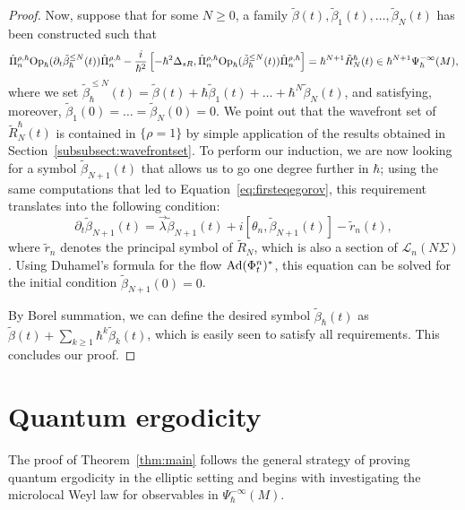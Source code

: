 \documentclass[12pt,a4paper]{amsart}
\theoremstyle{plain}
\theoremstyle{definition}
\theoremstyle{remark}
\numberwithin{equation}{section}
\theoremstyle{definition}
\def \Op{{\rm Op}}
\numberwithin{equation}{section}
\begin{document}
\begin{proof}
    Now, suppose that for some $N\geq 0$, a family $\tilde{\beta}(t),\tilde{\beta}_1(t),\dots,\tilde{\beta}_N(t)$ has been constructed such that 
    \begin{equation*}
        \hat{\Pi}_n^{\rho,\hbar} \Op_\hbar(\partial_t\tilde{\beta}_\hbar^{\leq N}(t))\hat{\Pi}_n^{\rho,\hbar} - \frac{i}{\hbar^2}\left[-\hbar^2\Delta_{sR},\hat{\Pi}_n^{\rho,\hbar} \Op_\hbar(\tilde{\beta}_\hbar^{\leq N}(t))\hat{\Pi}_n^{\rho,\hbar}\right] = \hbar^{N+1} \tilde{R}_N^\hbar(t)\in \hbar^{N+1}\Psi_\hbar^{-\infty}(M),
    \end{equation*}
    where we set $\tilde{\beta}_\hbar^{\leq N}(t) = \tilde{\beta}(t) + \hbar \tilde{\beta}_1(t)+\dots+\hbar^N\tilde{\beta}_N(t)$, and satisfying, moreover, $\tilde{\beta}_1(0) = \dots = \tilde{\beta}_N(0) = 0$. We point out that the wavefront set of $\tilde{R}_N^\hbar(t)$ is contained in $\{\rho = 1\}$ by simple application of the results obtained in Section~\ref{subsubsect:wavefrontset}. To perform our induction, we are now looking for a symbol $\tilde{\beta}_{N+1}(t)$ that allows us to go one degree further in $\hbar$; using the same computations that led to Equation~\eqref{eq:firsteqegorov}, this requirement translates into the following condition:
    \begin{equation*}
        \partial_t \tilde{\beta}_{N+1}(t) = \vec{\lambda}\tilde{\beta}_{N+1}(t) + i[\theta_n,\tilde{\beta}_{N+1}(t)] - \tilde{r}_n(t),
    \end{equation*}
    where $\tilde{r}_n$ denotes the principal symbol of $\tilde{R}_N$, which is also a section of $\mathscr{L}_n(N\Sigma)$. Using Duhamel's formula for the flow ${\rm Ad}(\Phi_t^n)^*$, this equation can be solved for the initial condition $\tilde{\beta}_{N+1}(0) = 0$.

    By Borel summation, we can define the desired symbol $\tilde{\beta}_\hbar(t)$ as $\tilde{\beta}(t)+ \sum_{k\geq 1}\hbar^k\tilde{\beta}_k(t)$, which is easily seen to satisfy all requirements. This concludes our proof.
\end{proof}

\section{Quantum ergodicity}
\label{sect:quantumergodicity}

The proof of Theorem~\ref{thm:main} follows the general strategy of proving quantum ergodicity in the elliptic setting and begins with investigating the microlocal Weyl law for observables in $\Psi_\hbar^{-\infty}(M)$.
\end{document}
